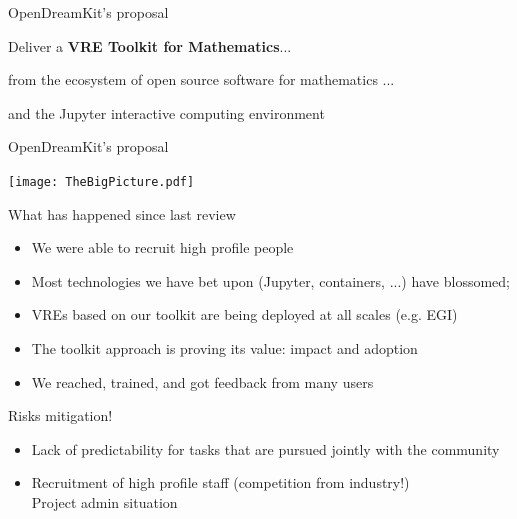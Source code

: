\documentclass{beamer}
\begin{document}
\begin{frame}{OpenDreamKit's proposal}\label{our-proposal}

  Deliver a \textbf{VRE Toolkit for Mathematics}...\pause\bigskip

  from the ecosystem of open source software for mathematics ...\pause\bigskip

  and the Jupyter interactive computing environment
\end{frame}

\begin{frame}{OpenDreamKit's proposal}\label{our-proposal}
  \centerline{\texttt{[image: TheBigPicture.pdf]}}
\end{frame}


\begin{frame}{What has happened since last review}
  \begin{itemize}
  \item We were able to recruit high profile people
  \item Most technologies we have bet upon (Jupyter, containers, ...)
    have blossomed; \pause\bigskip
  \item VREs based on our toolkit are being deployed at all scales
    (e.g. EGI)
    \pause\bigskip
  \item The toolkit approach is proving its value: impact and adoption
    \pause\bigskip
  \item We reached, trained, and got feedback from many users
    \pause\bigskip
  \end{itemize}

  Risks mitigation!
  
  \begin{itemize}
  \item Lack of predictability for tasks that are pursued jointly
    with the community
  \item Recruitment of high profile staff (competition from industry!)\\
    Project admin situation
  \end{itemize}
\end{frame}


\end{document}
